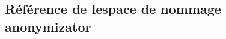 \hypertarget{namespaceanonymizator}{}\subsection{Référence de l\textquotesingle{}espace de nommage anonymizator}
\label{namespaceanonymizator}
